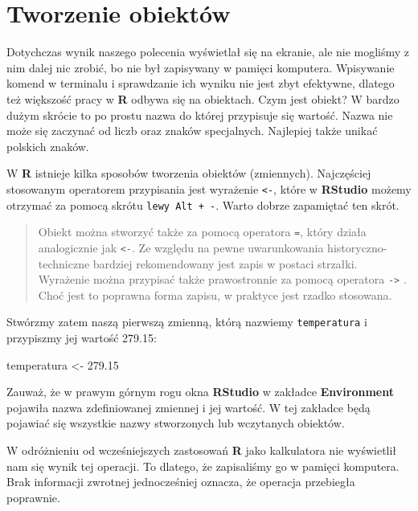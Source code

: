 \documentclass[]{book}
\newenvironment{Shaded}{\begin{snugshade}}{\end{snugshade}}
\newcommand{\FloatTok}[1]{\textcolor[rgb]{0.00,0.00,0.81}{#1}}
\newcommand{\StringTok}[1]{\textcolor[rgb]{0.31,0.60,0.02}{#1}}
\newcommand{\NormalTok}[1]{#1}
\theoremstyle{definition}
\theoremstyle{definition}
\theoremstyle{definition}
\theoremstyle{remark}
\begin{document}
\section{Tworzenie obiektów}\label{tworzenie-obiektow}

Dotychczas wynik naszego polecenia wyświetlał się na ekranie, ale nie
mogliśmy z nim dalej nic zrobić, bo nie był zapisywany w pamięci
komputera. Wpisywanie komend w terminalu i sprawdzanie ich wyniku nie
jest zbyt efektywne, dlatego też większość pracy w \textbf{R} odbywa się
na obiektach. Czym jest obiekt? W bardzo dużym skrócie to po prostu
nazwa do której przypisuje się wartość. Nazwa nie może się zaczynać od
liczb oraz znaków specjalnych. Najlepiej także unikać polskich znaków.

W \textbf{R} istnieje kilka sposobów tworzenia obiektów (zmiennych).
Najczęściej stosowanym operatorem przypisania jest wyrażenie
\texttt{\textless{}-}, które w \textbf{RStudio} możemy otrzymać za
pomocą skrótu \texttt{lewy\ Alt\ +\ -}. Warto dobrze zapamiętać ten
skrót.

\begin{quote}
Obiekt można stworzyć także za pomocą operatora \texttt{=}, który działa
analogicznie jak \texttt{\textless{}-}. Ze względu na pewne
uwarunkowania historyczno-techniczne bardziej rekomendowany jest zapis w
postaci strzałki. Wyrażenie można przypisać także prawostronnie za
pomocą operatora \texttt{-\textgreater{}} . Choć jest to poprawna forma
zapisu, w praktyce jest rzadko stosowana.
\end{quote}

Stwórzmy zatem naszą pierwszą zmienną, którą nazwiemy
\texttt{temperatura} i przypiszmy jej wartość 279.15:

\begin{Shaded}
\begin{Highlighting}[]
\NormalTok{temperatura <-}\StringTok{ }\FloatTok{279.15}
\end{Highlighting}
\end{Shaded}

Zauważ, że w prawym górnym rogu okna \textbf{RStudio} w zakładce
\textbf{Environment} pojawiła nazwa zdefiniowanej zmiennej i jej
wartość. W tej zakładce będą pojawiać się wszystkie nazwy stworzonych
lub wczytanych obiektów.

W odróżnieniu od wcześniejszych zastosowań \textbf{R} jako kalkulatora
nie wyświetlił nam się wynik tej operacji. To dlatego, że zapisaliśmy go
w pamięci komputera. Brak informacji zwrotnej jednocześniej oznacza, że
operacja przebiegła poprawnie.
\end{document}
